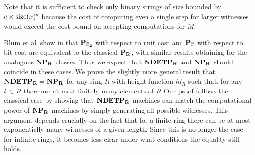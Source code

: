 {Note that it is sufficient to check only binary strings of size
bounded by $c \times \text{size}(x)^p$ because the cost of computing even a
single step for larger witnesses would exceed the cost bound on
accepting computations for $M$.  


Blum et al. show in \cite{B89} that $\mathbf{P_{\mathbb{Z}_{2}}}$ with
respect to unit cost and $\mathbf{P_{\mathbb{Z}}}$ with respect to bit cost
are equivalent to the classical $\mathbf{P_R}$, with similar results obtaining
for the analogous $\mathbf{NP_R}$ classes.  Thus we expect that $\mathbf{NDETP_R}$ and
$\mathbf{NP_R}$ should coincide in these cases.  We prove the slightly more
general result that $\mathbf{NDETP_R} = \mathbf{NP_R}$ for any ring $R$ with height
function $ht_R$ such that, for any $k \in R$ there are at most
finitely many elements of $R$ Our proof follows the classical case by
showing that $\mathbf{NDETP_R}$ machines can match the computational power of
$\mathbf{NP_R}$ machines by simply generating all possible witnesses.  This
argument depends crucially on the fact that for a finite ring there
can be at most exponentially many witnesses of a given length.  Since
this is no longer the case for infinite rings, it becomes less clear
under what conditions the equality still holds.

}
